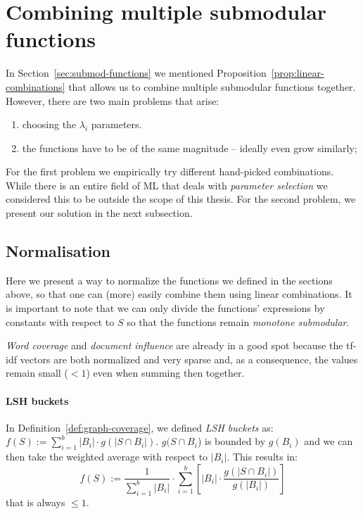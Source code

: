 \section{Combining multiple submodular functions}
\label{sec:combine}

In Section~\vref{sec:submod-functions} we mentioned
Proposition~\ref{prop:linear-combinations} that allows us to combine multiple
submodular functions together.
However, there are two main problems that arise:
\begin{enumerate}
  \item choosing the \(\lambda_i\) parameters.
  \item the functions have to be of the same magnitude -- ideally even grow
  similarly;
\end{enumerate}

For the first problem we empirically try different hand-picked combinations.
While there is an entire field of \ac{ML} that deals with \emph{parameter
selection} we considered this to be outside the scope of this thesis.
For the second problem, we present our solution in the next subsection.

\subsection{Normalisation}

Here we present a way to normalize the functions we defined in the sections
above, so that one can (more) easily combine them using linear combinations.
It is important to note that we can only divide the functions' expressions by
constants with respect to \(S\) so that the functions remain \emph{monotone
submodular}.

\emph{Word coverage} and \emph{document influence} are already in a good spot
because the tf-idf vectors are both normalized and very sparse and, as a
consequence, the values remain small (\(< 1\)) even when summing then together.

\paragraph{LSH buckets}
In Definition~\vref{def:graph-coverage}, we defined \emph{LSH buckets} as: \(f(S) := \sum_{i=1}^b |B_i| \cdot g(|S \cap
B_i|)\).  \(g(S \cap B_i\)) is bounded by \(g(B_i)\) and we can then take the
weighted average with respect to \(|B_i|\). This results in:
\[
  f(S) :=
    \frac{1}{\sum_{i=1}^b |B_i|} \cdot
    \sum_{i=1}^b \left[ |B_i| \cdot \frac{g(|S \cap B_i|)}{g(|B_i|)} \right]
\]
that is always \(\leq 1\).


